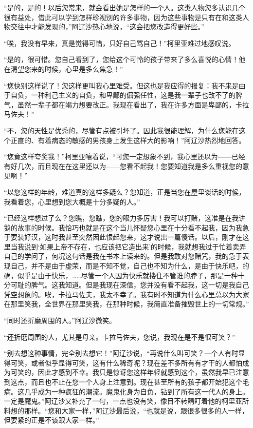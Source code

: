 \par “是的，是的！以后您常来，就会看出她是怎样的一个人。这类人物您多认识几个很有益处，借此可以学到怎样珍视别的许多事物，因为这些事物是只有在和这类人物交往中才能发现的，”阿辽沙热心地说，“这会把您改造得更好些。”
\par “唉，我没有早来，真是觉得可惜，只好自己骂自己！”柯里亚难过地感叹说。
\par “是的，很可惜。您自己看到了，您给这个可怜的孩子带来了多么喜悦的心情！他在渴望您来的时候，心里是多么焦急！”
\par “您快别这样说了！您这样更叫我心里难受。但这也是我应得的报复：我不来是由于自负，一种利己主义的自负，和卑鄙的倔强任性，这是我一辈子也改不了的脾气，虽然一辈子都在竭力想要改正。我现在看出了，我在许多方面是卑鄙的，卡拉马佐夫！”
\par “不，您的天性是优秀的，尽管有点被引坏了。因此我很能理解，为什么您能在这个正直的、有着病态的敏感的男孩身上发生这样大的影响！”阿辽沙热烈地回答。
\par “您竟这样夸奖我！”柯里亚嚷着说，“可您一定想象不到，我心里还以为——已经有好几次，而且现在在这里还以为——您看不起我！您要知道我是多么重视您的意见啊！”
\par “以您这样的年龄，难道真的这样多疑么？您知道，正是当您在屋里谈话的时候，我看着您，心里想到您大概是十分多疑的人。”
\par “已经这样想过了么？您瞧，您瞧，您的眼力多厉害！我可以打赌，这准是在我讲鹅的故事的时候。我恰巧也就是在这个当儿怀疑您心里在十分看不起我，因为我急于要装好汉，这时我甚至突然因此恨起您来，这才说出一篇傻话。以后，刚才在这里当我说到‘如果上帝不存在，也应该把它造出来’的时候，我就想我过于忙着卖弄自己的学问了，何况这句话是我在书本上读来的。但是我敢对您赌咒，我的急于表现自己，并不是由于虚荣，而是不知不觉，自己也不知为什么，是由于快乐吧，的确，似乎是由于快乐，……尽管一个人因为快乐就搂住不管谁的脖子，那是一种十分可耻的脾气。这我知道。但是我现在深信，您并没有看不起我，这一切是我自己凭空想象的。唉，卡拉马佐夫，我太不幸了。我有时不知道为什么心里总以为大家在那里笑我，全世界在那里笑我，在那种时候，我简直准备摧毁世上的一切常规。”
\par “同时还折磨周围的人。”阿辽沙微笑。
\par “还折磨周围的人，尤其是母亲。卡拉马佐夫，您说，我现在是不是很可笑？”
\par “别去想这种事情，完全别去想它！”阿辽沙说，“再说什么叫可笑？一个人有时显得可笑，或者似乎显得可笑，这有什么稀奇呢？现在差不多所有有才干的人都怕成为可笑的，因此才感到不幸。我只是惊讶您这样年轻就感到这个，虽然我早已注意到这点，而且也不止在您一个人身上注意到。现在甚至所有的孩子都开始犯这个毛病。这几乎成为一种疯狂的潮流。魔鬼化身为自负，钻到了所有这一代人的身上。一定是魔鬼。”阿辽沙又补充了一句，一点也没有笑，像目不转睛盯着他的柯里亚所料想的那样。“您和大家一样，”阿辽沙最后说，“也就是说，跟很多很多的人一样，但要紧的正是不该跟大家一样。”
